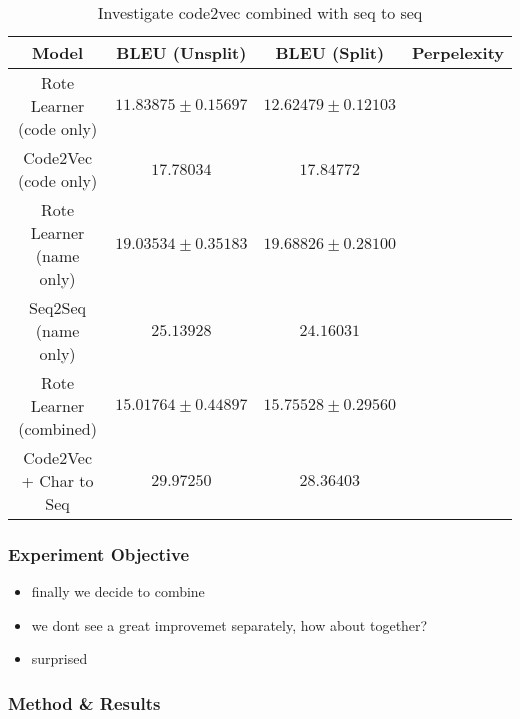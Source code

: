 \begin{table}[h!]
\begin{center}
\begin{tabular}{ c | c | c | c }
    Model                             & BLEU (Unsplit)  & BLEU (Split)    & Perpelexity \\
    \hline
    Rote Learner  (code only)        & $ 11.83875 \pm  0.15697 $ & $ 12.62479 \pm 0.12103 $ & \\
    Code2Vec  (code only)             & $ 17.78034 $ & $ 17.84772 $ & \\
    \hline
    \hline
    Rote Learner  (name only)         & $ 19.03534 \pm  0.35183 $ & $ 19.68826 \pm 0.28100 $ & \\
    Seq2Seq  (name only)              & $ 25.13928 $ & $ 24.16031 $ & \\
    \hline
    \hline
    Rote Learner (combined)            & $ 15.01764 \pm  0.44897 $ & $ 15.75528 \pm 0.29560 $ & \\
    Code2Vec  + Char to Seq           & $ 29.97250 $ & $ 28.36403 $ & \\
    \hline
\end{tabular}
\caption {Investigate code2vec combined with seq to seq}
\label{table:code2vec_embed}
\end{center}
\end{table}

\subsubsection{Experiment Objective} %

\begin{itemize}
    \item finally we decide to combine
    \item we dont see a great improvemet separately, how about together?
    \item surprised
\end{itemize}


\subsubsection{Method \& Results} %

